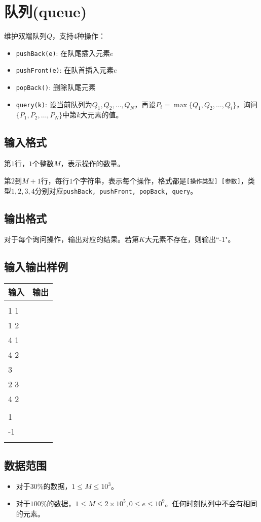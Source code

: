 \documentclass[a4paper]{article}
\newcommand{\problem}{\section}
\newcommand{\inputformat}{\subsection{输入格式}}
\newcommand{\outputformat}{\subsection{输出格式}}
\newcommand{\sample}[2]{
\subsection{输入输出样例}
\begin{tabular}{|l|l|}
    \hline
    输入 & 输出 \\
    \hline
    \begin{minipage}[t]{200pt}
        \begin{ttfamily} #1 \end{ttfamily}
    \end{minipage} &
    \begin{minipage}[t]{200pt}
        \begin{ttfamily} #2 \end{ttfamily}
    \end{minipage} \\
    \hline
\end{tabular}
\vspace{1ex}
\par
}
\newcommand{\dataset}{\subsection{数据范围}}
\begin{document}
\problem{队列(queue)}

维护双端队列$Q$，支持$4$种操作：
\begin{itemize}
    \item \texttt{pushBack(e)}: 在队尾插入元素$e$
    \item \texttt{pushFront(e)}: 在队首插入元素$e$
    \item \texttt{popBack()}: 删除队尾元素
    \item \texttt{query(k)}: 设当前队列为$Q_1, Q_2, \ldots, Q_N$，再设$P_i = \max\{Q_1, Q_2, \ldots, Q_i\}$，询问$\{P_1, P_2, \ldots, P_N\}$中第$k$大元素的值。
\end{itemize}

\inputformat

第$1$行，$1$个整数$M$，表示操作的数量。

第$2$到$M + 1$行，每行$1$个字符串，表示每个操作，格式都是\texttt{[操作类型] [参数]}，类型$1, 2, 3, 4$分别对应\texttt{pushBack, pushFront, popBack, query}。

\outputformat

对于每个询问操作，输出对应的结果。若第$K$大元素不存在，则输出``-1"。

\sample{
7 \\
1 1 \\
1 2 \\
4 1 \\
4 2 \\
3 \\
2 3 \\
4 2 \\
}{
2 \\
1 \\
-1 \\
}

\dataset
\begin{itemize}
    \item 对于$30\%$的数据，$1 \leq M \leq 10^3$。

    \item 对于$100\%$的数据，$1 \leq M \leq 2 \times 10^5, 0 \leq e \leq 10^9$。任何时刻队列中不会有相同的元素。

\end{itemize}
\end{document}
